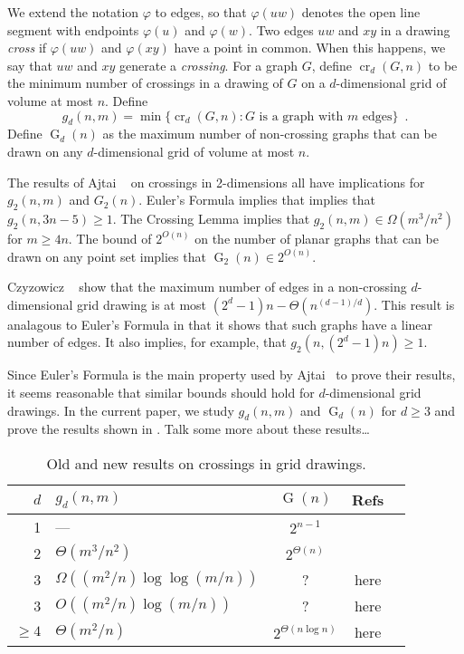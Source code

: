 \documentclass{patmorin}
\DeclareMathOperator{\crs}{cr}
\DeclareMathOperator{\ncs}{G}
\begin{document}
We extend the notation $\varphi$ to edges, so that $\varphi(uw)$ denotes
the open line segment with endpoints $\varphi(u)$ and $\varphi(w)$.
Two edges $uw$ and $xy$ in a drawing \emph{cross} if $\varphi(uw)$
and $\varphi(xy)$ have a point in common.  When this happens, we
say that $uw$ and $xy$ generate a \emph{crossing}.  For a graph $G$,
define $\crs_d(G,n)$ to be the minimum number of crossings in a drawing
of $G$ on a $d$-dimensional grid of volume at most $n$.  Define
\[ g_d(n,m)=\min\{\crs_d(G,n):\text{$G$ is a graph with $m$ edges}\} \enspace .
\]
Define $\ncs_d(n)$ as the maximum number of non-crossing graphs that
can be drawn on any $d$-dimensional grid of volume at most $n$.

The results of Ajtai \etal\ \cite{S} on crossings in 2-dimensions all
have implications for $g_2(n,m)$ and $G_2(n)$. Euler's Formula implies
that implies that $g_2(n,3n-5)\ge 1$.  The Crossing Lemma implies that
$g_2(n,m)\in\Omega(m^3/n^2)$ for $m\ge 4n$.  The bound of $2^{O(n)}$ on
the number of planar graphs that can be drawn on any point set implies
that $\ncs_2(n)\in 2^{O(n)}$.

Czyzowicz \etal\ \cite{cXX} show that the maximum number of
edges in a non-crossing $d$-dimensional grid drawing is at most
$(2^d-1)n-\Theta(n^{(d-1)/d})$. This result is analagous to Euler's
Formula in that it shows that such graphs have a linear number of edges.
It also implies, for example, that $g_2(n,(2^d-1)n)\ge 1$.

Since Euler's Formula is the main property used by Ajtai \etal\ to
prove their results, it seems reasonable that similar bounds should
hold for $d$-dimensional grid drawings.  In the current paper, we study
$g_d(n,m)$ and $\ncs_d(n)$ for $d\ge 3$ and prove the results shown
in .  Talk some more about these results\ldots



\begin{table}
  \begin{center}
    \begin{tabular}{rlccc}
      $d$ & $g_d(n,m)$ & $\ncs(n)$ & Refs \\ \hline
      1 & --- & $2^{n-1}$ & \\
      2 & $\Theta(m^{3}/n^2)$ & $2^{\Theta(n)}$ & \cite{aiisjsXX} \\
      3 & $\Omega((m^2/n)\log\log(m/n))$ & ?  & here \\
      3 & $O((m^2/n)\log(m/n))$ & ?  & here \\
      $\ge 4$ & $\Theta(m^{2}/n)$ & $2^{\Theta(n\log n)}$ & here \\
    \end{tabular}
  \end{center}
  \caption{Old and new results on crossings in grid drawings.}
\end{table}
\end{document}
